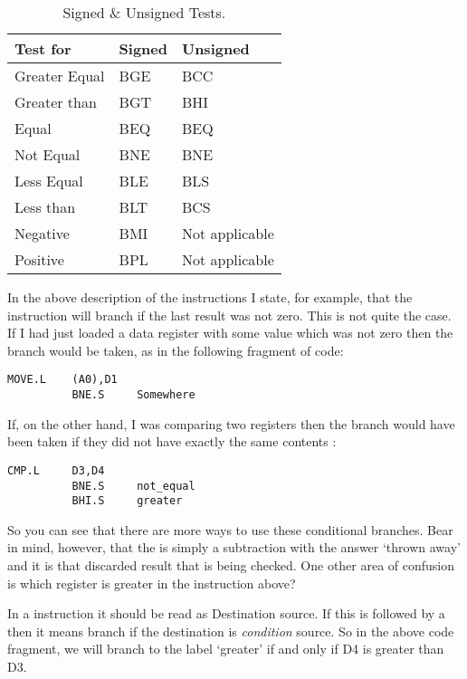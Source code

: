\begin{table}[htbp]
\centering
\begin{tabular}{l l l}
\toprule
\textbf{Test for} & \textbf{Signed} & \textbf{Unsigned}\\
\midrule
Greater Equal & BGE & BCC\\
Greater than & BGT & BHI\\
Equal & BEQ & BEQ\\
Not Equal & BNE & BNE\\
Less Equal & BLE & BLS\\
Less than & BLT & BCS\\
Negative & BMI & Not applicable\\
Positive & BPL & Not applicable\\
\bottomrule
\end{tabular}
\caption{Signed \& Unsigned Tests.}
\label{tab:SignedAndUnsignedTests}
\end{table}


In the above description of the  instructions I state, for
    example, that the  instruction will branch if the last result was not
    zero. This is not quite the case. If I had just loaded a data register
    with some value which was not zero then the branch would be taken, as in
    the following fragment of code:

\begin{lstlisting}[firstnumber=1,]
          MOVE.L    (A0),D1 
          BNE.S     Somewhere 
\end{lstlisting}

If, on the other hand, I was comparing two registers then the branch
    would have been taken if they did not have exactly the same contents
   :

\begin{lstlisting}[firstnumber=1,]
          CMP.L     D3,D4 
          BNE.S     not_equal
          BHI.S     greater
\end{lstlisting}

So you can see that there are more ways to use these conditional
    branches. Bear in mind, however, that the  is simply a subtraction with
    the answer `thrown away' and it is that discarded result that is being checked. One
    other area of confusion is which register is greater in the 
    instruction above?

In a  instruction it should be read as Destination  source. If this is
followed by a  then it means branch if the destination is
\emph{condition} source. So in the above code fragment, we will branch to
the label `greater' if and only if D4 is greater than D3.

